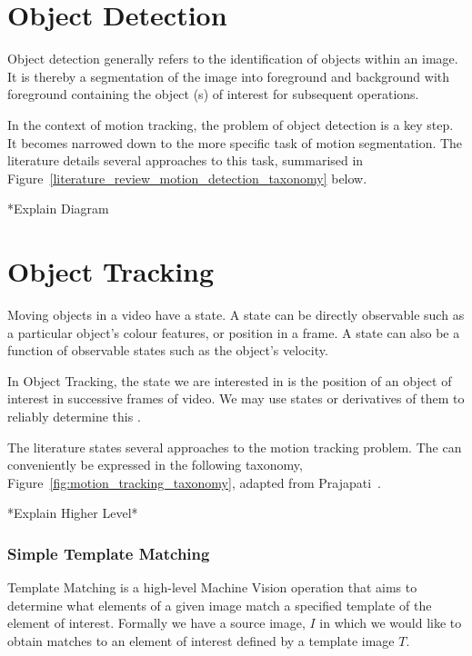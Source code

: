 \section{Object Detection}
Object detection generally refers to the identification of objects within
an image. It is thereby a segmentation of the image into foreground
and background with foreground containing the object (s) of interest for subsequent
operations.

In the context of motion tracking, the problem of object detection is a key
step. It becomes narrowed down to the more specific task of motion segmentation.
The literature details several approaches to this task, summarised in 
Figure~\ref{literature_review_motion_detection_taxonomy} below.


*Explain Diagram

\section{Object Tracking}
Moving objects in a video have a state. A state can be directly observable such as a
particular object's colour features, or position in a frame. A state can also be a function
of observable states such as the object's velocity.

In Object Tracking, the state we are interested in is the position of an object
of interest in successive frames of video. We may use states or derivatives of
them to reliably determine this \cite{Forsyth2012}.

The literature states several approaches to the motion tracking problem. The can
conveniently be expressed in the following taxonomy, Figure~\ref{fig:motion_tracking_taxonomy},
adapted from Prajapati~\cite{Prajapati2015}.


*Explain Higher Level*

\subsubsection{Simple Template Matching}
Template Matching is a high-level Machine Vision operation that aims to determine
what elements of a given image match a specified template of the element of
interest.
Formally we have a source image, $I$ in which we would like to obtain matches to
an element of interest defined by a template image $T$.

